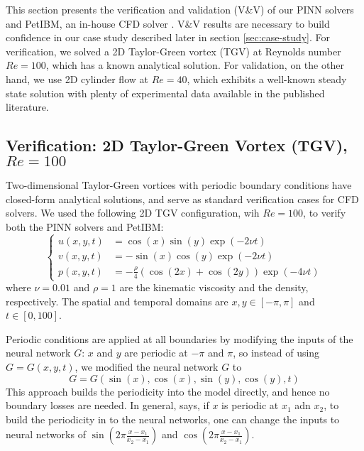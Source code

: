 
This section presents the verification and validation (V\&V) of our PINN solvers and PetIBM, an in-house CFD solver \cite{chuang_petibm_2018}.
V\&V results are necessary to build confidence in our case study described later in section \ref{sec:case-study}.
For verification, we solved a 2D Taylor-Green vortex (TGV) at Reynolds number $Re=\num{100}$, which has a known analytical solution.
For validation, on the other hand, we use 2D cylinder flow at $Re=40$, which exhibits a well-known steady state solution with plenty of experimental data available in the published literature.

\subsection{Verification: 2D Taylor-Green Vortex (TGV), $Re=\num{100}$}\label{sec:verification}

Two-dimensional Taylor-Green vortices with periodic boundary conditions have closed-form analytical solutions,
and serve as standard verification cases for CFD solvers.
We used the following 2D TGV configuration, wih $Re=\num{100}$, to verify both the PINN solvers and PetIBM:
\begin{equation}\label{eq:tgv}
    \left\{
        \begin{aligned}
            u(x, y, t) &= \cos(x)\sin(y)\exp(-2 \nu t) \\
            v(x, y, t) &= - \sin(x)\cos(y)\exp(-2 \nu t) \\
            p(x, y, t) &= -\frac{\rho}{4}\left(\cos(2x) + \cos(2y)\right)\exp(-4 \nu t)
        \end{aligned}
    \right.
\end{equation}
where $\nu=\num{0.01}$ and $\rho=\num{1}$ are the kinematic viscosity and the density, respectively.
The spatial and temporal domains are $x, y \in \left[-\pi, \pi\right]$ and $t \in [0, 100]$.

Periodic conditions are applied at all boundaries by modifying the inputs of the neural network $G$: $x$ and $y$ are periodic at $-\pi$ and $\pi$, so instead of using $G=G(x, y, t)$, we modified the neural network $G$ to
\begin{equation}\label{eq:periodic-bc}
    G = G(\sin(x), \cos(x), \sin(y), \cos(y), t)
\end{equation}
This approach builds the periodicity into the model directly, and hence no boundary losses are needed.
In general, says, if $x$ is periodic at $x_1$ adn $x_2$, to build the periodicity in to the neural networks, one can change the inputs to neural networks of $\sin({2\pi\frac{x-x_1}{x_2-x_1}})$ and $\cos({2\pi\frac{x-x_1}{x_2-x_1}})$.

